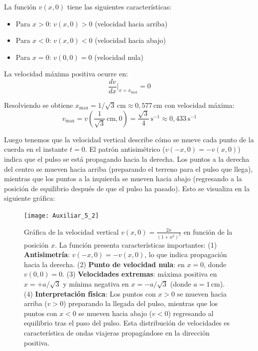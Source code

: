 \documentclass[
  11pt,
  letterpaper,
   addpoints,
   answers
  ]{exam}
\begin{document}
\begin{questions}
\begin{solution}
  La función $v(x,0)$ tiene las siguientes características:
  
  \begin{itemize}
    \item Para $x > 0$: $v(x,0) > 0$ (velocidad hacia arriba)
    \item Para $x < 0$: $v(x,0) < 0$ (velocidad hacia abajo)  
    \item Para $x = 0$: $v(0,0) = 0$ (velocidad nula)
  \end{itemize}
  
  La velocidad máxima positiva ocurre en:
  \begin{equation}
    \frac{dv}{dx}\bigg|_{x=x_{\max}} = 0
  \end{equation}
  
  Resolviendo se obtiene $x_{\max} = 1/\sqrt{3}\,\mathrm{cm} \approx 0{,}577\,\mathrm{cm}$ con velocidad máxima:
  \begin{equation}
    v_{\max} = v\left(\frac{1}{\sqrt{3}}\,\mathrm{cm}, 0\right) = \frac{\sqrt{3}}{4}\,\mathrm{s}^{-1} \approx 0{,}433\,\mathrm{s}^{-1}
  \end{equation}
  
  Luego tenemos que la velocidad vertical describe cómo se mueve cada punto de la cuerda en el instante $t = 0$. El patrón antisimétrico ($v(-x,0) = -v(x,0)$) indica que el pulso se está propagando hacia la derecha. Los puntos a la derecha del centro se mueven hacia arriba (preparando el terreno para el pulso que llega), mientras que los puntos a la izquierda se mueven hacia abajo (regresando a la posición de equilibrio después de que el pulso ha pasado). Esto se visualiza en la siguiente gráfica:
  
  \begin{figure}[H]
    \centering
    \texttt{[image: Auxiliar\_5\_2]}
    \caption{Gráfica de la velocidad vertical $v(x,0) = \frac{2x}{(1+x^2)^2}$ en función de la posición $x$. La función presenta características importantes: (1) \textbf{Antisimetría}: $v(-x,0) = -v(x,0)$, lo que indica propagación hacia la derecha. (2) \textbf{Punto de velocidad nula}: en $x = 0$, donde $v(0,0) = 0$. (3) \textbf{Velocidades extremas}: máxima positiva en $x = +a/\sqrt{3}$ y mínima negativa en $x = -a/\sqrt{3}$ (donde $a = 1\,\mathrm{cm}$). (4) \textbf{Interpretación física}: Los puntos con $x > 0$ se mueven hacia arriba ($v > 0$) preparando la llegada del pulso, mientras que los puntos con $x < 0$ se mueven hacia abajo ($v < 0$) regresando al equilibrio tras el paso del pulso. Esta distribución de velocidades es característica de ondas viajeras propagándose en la dirección positiva.}
  \end{figure}
\end{solution}


\end{questions}
\end{document}
